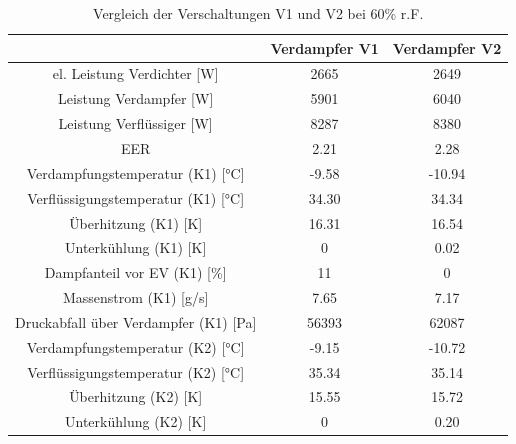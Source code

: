 \begin{table}[h!]
\centering
\caption{Vergleich der Verschaltungen V1 und V2 bei 60\% r.F.}
\label{tab:VergleichV1V2_60rF}
\begin{tabular}{|ccc|}
\hline

                                                                & Verdampfer V1               & Verdampfer V2 \\ \hline
\multicolumn{1}{|c|}{el. Leistung Verdichter {[}W{]}}           & \multicolumn{1}{c|}{2665}   & 2649          \\
\multicolumn{1}{|c|}{Leistung Verdampfer {[}W{]}}               & \multicolumn{1}{c|}{5901}   & 6040          \\
\multicolumn{1}{|c|}{Leistung Verflüssiger {[}W{]}}             & \multicolumn{1}{c|}{8287}   & 8380          \\
\multicolumn{1}{|c|}{EER}                                       & \multicolumn{1}{c|}{2.21}   & 2.28          \\ \hline
\multicolumn{1}{|c|}{Verdampfungstemperatur (K1) {[}°C{]}}      & \multicolumn{1}{c|}{-9.58}  & -10.94        \\
\multicolumn{1}{|c|}{Verflüssigungstemperatur (K1) {[}°C{]}}    & \multicolumn{1}{c|}{34.30}  & 34.34         \\
\multicolumn{1}{|c|}{Überhitzung (K1) {[}K{]}}                  & \multicolumn{1}{c|}{16.31}  & 16.54         \\
\multicolumn{1}{|c|}{Unterkühlung (K1) {[}K{]}}                 & \multicolumn{1}{c|}{0}      & 0.02          \\
\multicolumn{1}{|c|}{Dampfanteil vor EV (K1) {[}\%{]}}          & \multicolumn{1}{c|}{11}     & 0             \\
\multicolumn{1}{|c|}{Massenstrom (K1) {[}g/s{]}}                & \multicolumn{1}{c|}{7.65}   & 7.17          \\
\multicolumn{1}{|c|}{Druckabfall über Verdampfer (K1) {[}Pa{]}} & \multicolumn{1}{c|}{56393}  & 62087         \\ \hline
\multicolumn{1}{|c|}{Verdampfungstemperatur (K2) {[}°C{]}}      & \multicolumn{1}{c|}{-9.15}  & -10.72        \\
\multicolumn{1}{|c|}{Verflüssigungstemperatur (K2) {[}°C{]}}    & \multicolumn{1}{c|}{35.34}  & 35.14         \\
\multicolumn{1}{|c|}{Überhitzung (K2) {[}K{]}}                  & \multicolumn{1}{c|}{15.55}  & 15.72         \\
\multicolumn{1}{|c|}{Unterkühlung (K2) {[}K{]}}                 & \multicolumn{1}{c|}{0}      & 0.20          \\

\end{tabular}
\end{table}
